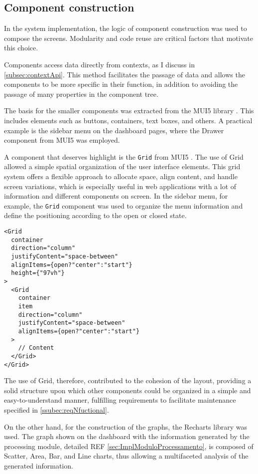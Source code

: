 \subsection{Component construction}\label{subsec:componentization}
In the system implementation, the logic of component construction \cite{reactFirstComponent} was used to compose the screens. Modularity and code reuse are critical factors that motivate this choice.

Components access data directly from contexts, as I discuss in \ref{subsec:contextApi}. This method facilitates the passage of data and allows the components to be more specific in their function, in addition to avoiding the passage of many properties in the component tree.

The basis for the smaller components was extracted from the \gls{MUI5} library \cite{muiDocs}. This includes elements such as buttons, containers, text boxes, and others. A practical example is the sidebar menu on the dashboard pages, where the Drawer component from \gls{MUI5} was employed.

A component that deserves highlight is the \texttt{Grid} from \gls{MUI5} \cite{muiReactGrid}. The use of Grid allowed a simple spatial organization of the user interface elements. This grid system offers a flexible approach to allocate space, align content, and handle screen variations, which is especially useful in web applications with a lot of information and different components on screen. In the sidebar menu, for example, the \texttt{Grid} component was used to organize the menu information and define the positioning according to the open or closed state.

\begin{verbatim}
<Grid 
  container
  direction="column"
  justifyContent="space-between"
  alignItems={open?"center":"start"}
  height={"97vh"}
>
  <Grid 
    container
    item
    direction="column"
    justifyContent="space-between"
    alignItems={open?"center":"start"}
  >
    // Content
  </Grid>
</Grid>
\end{verbatim}

The use of Grid, therefore, contributed to the cohesion of the layout, providing a solid structure upon which other components could be organized in a simple and easy-to-understand manner, fulfilling requirements to facilitate maintenance specified in \ref{ssubec:reqNfuctional}.

On the other hand, for the construction of the graphs, the Recharts library was used. The graph shown on the dashboard with the information generated by the processing module, detailed REF \ref{sec:ImplModuloProcessamento}, is composed of Scatter, Area, Bar, and Line charts, thus allowing a multifaceted analysis of the generated information.

